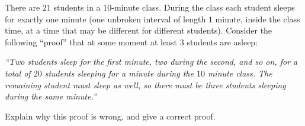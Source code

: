 There are $21$ students in a $10$-minute class. During the class each student sleeps for exactly one minute (one unbroken interval of length $1$ minute, inside the class time, at a time that may be different for different students). Consider the following ``proof'' that at some moment at least $3$ students are asleep:

\emph{``Two students sleep for the first minute, two during the second, and so on, for a total of $20$ students sleeping for a minute during the $10$ minute class. The remaining student must sleep as well, so there must be three students sleeping during the same minute.''}

Explain why this proof is wrong, and give a correct proof.
